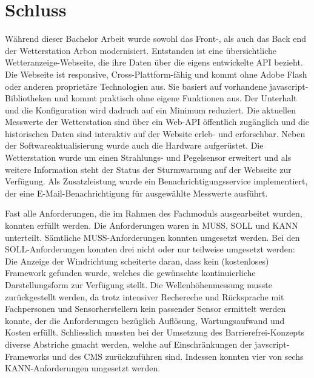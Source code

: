 \section*{Schluss}



Während dieser Bachelor Arbeit wurde sowohl das Front-, als auch das Back end der Wetterstation Arbon modernisiert. Entstanden ist eine übersichtliche Wetteranzeige-Webseite, die ihre Daten über die eigens entwickelte API bezieht. Die Webseite ist responsive, Cross-Plattform-fähig und kommt ohne Adobe Flash oder anderen proprietäre Technologien aus. Sie basiert auf vorhandene javascript-Bibliotheken und kommt praktisch ohne eigene Funktionen aus. Der Unterhalt und die Konfiguration wird dadruch auf ein Minimum reduziert. Die aktuellen Messwerte der Wetterstation sind über ein Web-API öffentlich zugänglich und die historischen Daten sind interaktiv auf der Website erleb- und erforschbar. Neben der Softwareaktualisierung wurde auch die Hardware aufgerüstet. Die Wetterstation wurde um einen Strahlungs- und Pegelsensor erweitert und als weitere Information steht der Status der Sturmwarnung auf der Webseite zur Verfügung. Als Zusatzleistung wurde ein Benachrichtigungsservice implementiert, der eine E-Mail-Benachrichtigung für ausgewählte Messwerte ausführt.
\newline



Fast alle Anforderungen, die im Rahmen des Fachmoduls ausgearbeitet wurden, konnten erfüllt werden. Die Anforderungen waren in MUSS, SOLL und KANN unterteilt. Sämtliche MUSS-Anforderungen konnten umgesetzt werden. Bei den SOLL-Anforderungen konnten drei nicht oder nur teilweise umgesetzt werden: Die Anzeige der Windrichtung scheiterte daran, dass kein (kostenloses) Framework gefunden wurde, welches die gewünschte kontinuierliche Darstellungsform zur Verfügung stellt. Die Wellenhöhenmessung musste zurückgestellt werden, da trotz intensiver Rechereche und Rücksprache mit Fachpersonen und Sensorherstellern kein passender
Sensor ermittelt werden konnte, der die Anforderungen bezüglich Auflösung, Wartungsaufwand und Kosten erfüllt. Schliesslich mussten bei der Umsetzung des Barrierefrei-Konzepts diverse Abstriche gmacht werden, welche auf Einschränkungen der javscript-Frameworks und des CMS zurückzuführen sind. Indessen konnten vier von sechs KANN-Anforderungen umgesetzt werden.
\newline

